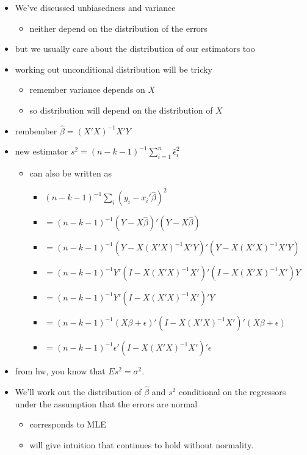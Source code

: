 \begin{itemize}
\item We've discussed unbiasedness and variance
\begin{itemize}
\item neither depend on the distribution of the errors
\end{itemize}
\item but we usually care about the distribution of our estimators too
\item working out unconditional distribution will be tricky
\begin{itemize}
\item remember variance depends on $X$
\item so distribution will depend on the distribution of $X$
\end{itemize}
\item rembember $\hat\beta = (X'X)^{-1} X'Y$
\item new estimator $s^2 = (n-k-1)^{-1} \sum_{i=1}^n \hat\epsilon_i^2$
\begin{itemize}
\item can also be written as
\begin{itemize}
\item $(n-k-1)^{-1} \sum_i (y_i - x_i'\hat\beta)^2$
\item $= (n-k-1)^{-1} (Y - X\hat\beta)'(Y - X\hat\beta)$
\item $= (n-k-1)^{-1} (Y - X(X'X)^{-1}X'Y)'(Y - X(X'X)^{-1}X'Y)$
\item $= (n-k-1)^{-1} Y'(I - X(X'X)^{-1}X')'(I - X(X'X)^{-1}X')Y$
\item $= (n-k-1)^{-1} Y'(I - X(X'X)^{-1}X')'Y$
\item $= (n-k-1)^{-1} (X\beta + \epsilon)'(I -
           X(X'X)^{-1}X')'(X\beta + \epsilon)$
\item $= (n-k-1)^{-1} \epsilon'(I - X(X'X)^{-1}X')'\epsilon$
\end{itemize}
\end{itemize}
\item from hw, you know that $E s^2 = \sigma^2$.
\item We'll work out the distribution of $\hat\beta$ and $s^2$
       conditional on the regressors under the assumption that the
       errors are normal
\begin{itemize}
\item corresponds to MLE
\item will give intuition that continues to hold without normality.
\end{itemize}
\end{itemize}
